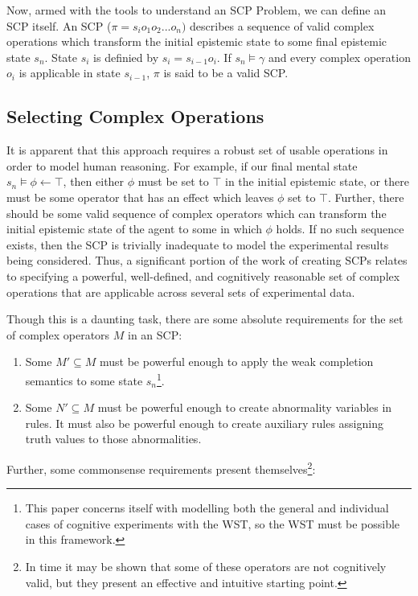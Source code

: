 \documentclass{article}
\begin{document}
Now, armed with the tools to understand an SCP Problem, we can define an SCP itself. An SCP ($\pi=s_i o_1 o_2 ... o_n)$ describes a sequence of valid complex operations which transform the initial epistemic state to some final epistemic state $s_n$. State $s_i$ is definied by $s_i = s_{i-1} o_{i}$. If $s_n \models \gamma$ and every complex operation $o_i$ is applicable in state $s_{i-1}$, $\pi$ is said to be a valid SCP.

\subsection{Selecting Complex Operations}

It is apparent that this approach requires a robust set of usable operations in order to model human reasoning. For example, if our final mental state $s_n \models \phi \leftarrow \top$, then either $\phi$ must be set to $\top$ in the initial epistemic state, or there must be some operator that has an effect which leaves $\phi$ set to $\top$. Further, there should be some valid sequence of complex operators which can transform the initial epistemic state of the agent to some in which $\phi$ holds. If no such sequence exists, then the SCP is trivially inadequate to model the experimental results being considered. Thus, a significant portion of the work of creating SCPs relates to specifying a powerful, well-defined, and cognitively reasonable set of complex operations that are applicable across several sets of experimental data.

Though this is a daunting task, there are some absolute requirements for the set of complex operators $M$ in an SCP:

\begin{enumerate}
\item Some $M' \subseteq M$ must be powerful enough to apply the weak completion semantics to some state $s_n$\footnote{This paper concerns itself with modelling both the general and individual cases of cognitive experiments with the WST, so the WST must be possible in this framework.}.
\item Some $N' \subseteq M$ must be powerful enough to create abnormality variables in rules. It must also be powerful enough to create auxiliary rules assigning truth values to those abnormalities.
\end{enumerate}

Further, some commonsense requirements present themselves\footnote{In time it may be shown that some of these operators are not cognitively valid, but they present an effective and intuitive starting point.}:
\end{document}

